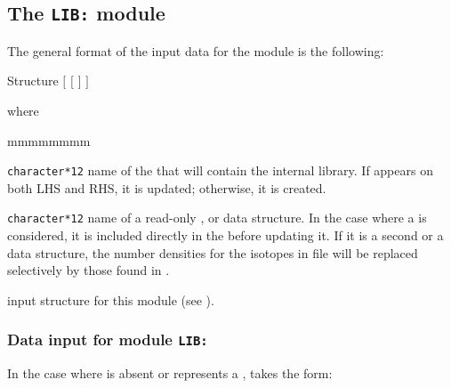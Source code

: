 \subsection{The {\tt LIB:} module}\label{sect:LIBData}

The general format of the input data for the  module is the
following:

\begin{DataStructure}{Structure }
 \moc{:=}  $[$  $[$  $]$ $]$ 
\moc{::} 
\end{DataStructure}

\noindent
where

\begin{ListeDeDescription}{mmmmmmmm}

\item[\dusa{MICLIB}] {\tt character*12} name of the  that will
contain the internal library. If  appears on both LHS and RHS, it is
updated; otherwise, it is created. 

\item[\dusa{OLDLIB}] {\tt character*12} name of a read-only ,
 or  data structure. In the case where a 
is considered, it is included directly in the  before
updating it. If it is a second  or a 
data structure, the number densities for the isotopes in file
 will be replaced selectively by those found in .

\item[\dstr{desclib}] input structure for this module (see
).

\end{ListeDeDescription}

\vskip 0.2cm

\subsubsection{Data input for module {\tt LIB:}}\label{sect:desclib}

In the case where  is absent or represents a ,
 takes the form:

